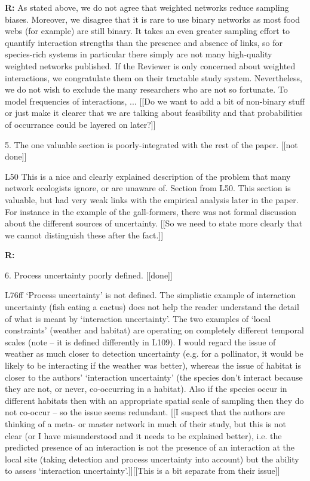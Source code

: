 \documentclass[12pt]{letter}
\newenvironment{refquote}{\bigskip \begin{it}}{\end{it}\smallskip}
\begin{document}
		\textbf{R:} As stated above, we do not agree that weighted networks reduce sampling biases. Moreover, we disagree that it is rare to use binary networks as most food webs (for example) are still binary. It takes an even greater sampling effort to quantify interaction strengths than the presence and absence of links, so for species-rich systems in particular there simply are not many high-quality weighted networks published. If the Reviewer is only concerned about weighted interactions, we congratulate them on their tractable study system. Nevertheless, we do not wish to exclude the many researchers who are not so fortunate.
		\smallskip
		To model frequencies of interactions, ...
			 [[Do we want to add a bit of non-binary stuff or just make it clearer that we are talking about feasibility and that probabilities of occurrance could be layered on later?]]


	5. The one valuable section is poorly-integrated with the rest of the paper. [[not done]]

		\begin{refquote}
		L50 This is a nice and clearly explained description of the problem that many network ecologists ignore, or are unaware of.
		Section from L50. This section is valuable, but had very weak links with the empirical analysis later in the paper. For instance in the example of the gall-formers, there was not formal discussion about the different sources of uncertainty. [[So we need to state more clearly that we cannot distinguish these after the fact.]]
		\end{refquote}

		\textbf{R:}

	6. Process uncertainty poorly defined. [[done]]

		\begin{refquote}
		L76ff ‘Process uncertainty’ is not defined. The simplistic example of interaction uncertainty (fish eating a cactus) does not help the reader understand the detail of what is meant by ‘interaction uncertainty’. The two examples of ‘local constraints’ (weather and habitat) are operating on completely different temporal scales (note – it is defined differently in L109). I would regard the issue of weather as much closer to detection uncertainty (e.g. for a pollinator, it would be likely to be interacting if the weather was better), whereas the issue of habitat is closer to the authors’ ‘interaction uncertainty’ (the species don’t interact because they are not, or never, co-occurring in a habitat). Also if the species occur in different habitats then with an appropriate spatial scale of sampling then they do not co-occur – so the issue seems redundant. [[I suspect that the authors are thinking of a meta- or master network in much of their study, but this is not clear (or I have misunderstood and it needs to be explained better), i.e. the predicted presence of an interaction is not the presence of an interaction at the local site (taking detection and process uncertainty into account) but the ability to assess ‘interaction uncertainty’.]][[This is a bit separate from their issue]]
		\end{refquote}
\end{document}
